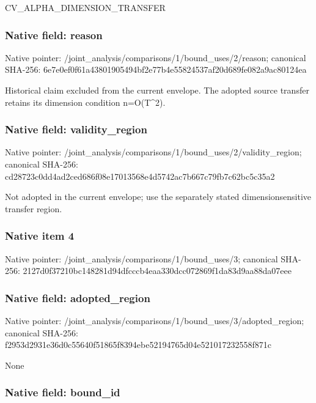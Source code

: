 \documentclass[10pt,a4paper]{article}
\begin{document}
CV\_ALPHA\_DIMENSION\_TRANSFER


\subsubsection{Native field: reason}


Native pointer: /joint\_analysis/comparis\allowbreak{}ons/1/bound\_uses/2/reaso\allowbreak{}n; canonical SHA-256: 6e7e0ef0f61a43801905494b\allowbreak{}f2e77b4e55824537af20d689\allowbreak{}fe082a9ac80124ea


Historical claim excluded from the current envelope. The adopted source transfer retains its dimension condition n=O(T\textasciicircum{}2).


\subsubsection{Native field: validity\_region}


Native pointer: /joint\_analysis/comparis\allowbreak{}ons/1/bound\_uses/2/valid\allowbreak{}ity\_region; canonical SHA-256: cd28723c0dd4ad2ced686f08\allowbreak{}e17013568e4d5742ac7b667c\allowbreak{}79fb7c62bc5c35a2


Not adopted in the current envelope; use the separately stated dimensionsensitive transfer region.


\subsubsection{Native item 4}


Native pointer: /joint\_analysis/comparis\allowbreak{}ons/1/bound\_uses/3; canonical SHA-256: 2127d0f37210bc148281d94d\allowbreak{}fcccb4eaa330dcc072869f1d\allowbreak{}a83d9aa88da07eee



\subsubsection{Native field: adopted\_region}


Native pointer: /joint\_analysis/comparis\allowbreak{}ons/1/bound\_uses/3/adopt\allowbreak{}ed\_region; canonical SHA-256: f2953d2931e36d0c55640f51\allowbreak{}865f8394ebe52194765d04e5\allowbreak{}21017232558f871c


None


\subsubsection{Native field: bound\_id}
\end{document}
